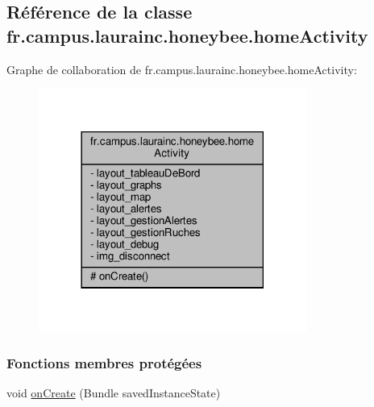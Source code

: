 \hypertarget{classfr_1_1campus_1_1laurainc_1_1honeybee_1_1home_activity}{}\subsection{Référence de la classe fr.\+campus.\+laurainc.\+honeybee.\+home\+Activity}
\label{classfr_1_1campus_1_1laurainc_1_1honeybee_1_1home_activity}


Graphe de collaboration de fr.\+campus.\+laurainc.\+honeybee.\+home\+Activity\+:\nopagebreak
\begin{figure}[H]
\begin{center}
\leavevmode
\includegraphics[width=249pt]{classfr_1_1campus_1_1laurainc_1_1honeybee_1_1home_activity__coll__graph}
\end{center}
\end{figure}
\subsubsection*{Fonctions membres protégées}
\begin{DoxyCompactItemize}
\item 
void \hyperlink{classfr_1_1campus_1_1laurainc_1_1honeybee_1_1home_activity_a2fbd2e53b0138742f01d58ee454fb502}{on\+Create} (Bundle saved\+Instance\+State)
\end{DoxyCompactItemize}
